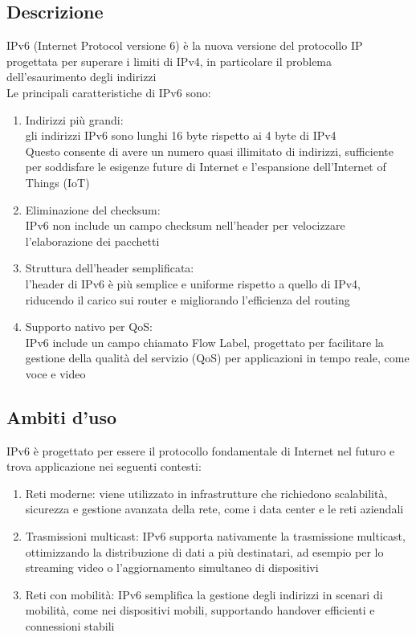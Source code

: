 \documentclass[10pt,oneside,a4paper]{article}
\begin{document}
\subsection{Descrizione}
IPv6 (Internet Protocol versione 6) è la nuova versione del protocollo IP progettata per superare i limiti di IPv4, in particolare il problema dell'esaurimento degli indirizzi\\
Le principali caratteristiche di IPv6 sono:
\begin{enumerate}
\item Indirizzi più grandi:\\
gli indirizzi IPv6 sono lunghi 16 byte rispetto ai 4 byte di IPv4\\
Questo consente di avere un numero quasi illimitato di indirizzi, sufficiente per soddisfare le esigenze future di Internet e l'espansione dell'Internet of Things (IoT)
\item Eliminazione del checksum:\\
IPv6 non include un campo checksum nell'header per velocizzare l'elaborazione dei pacchetti
\item Struttura dell'header semplificata:\\
l'header di IPv6 è più semplice e uniforme rispetto a quello di IPv4, riducendo il carico sui router e migliorando l'efficienza del routing
\item Supporto nativo per QoS:\\
IPv6 include un campo chiamato Flow Label, progettato per facilitare la gestione della qualità del servizio (QoS) per applicazioni in tempo reale, come voce e video
\end{enumerate}
\subsection{Ambiti d'uso}
IPv6 è progettato per essere il protocollo fondamentale di Internet nel futuro e trova applicazione nei seguenti contesti:
\begin{enumerate}
\item Reti moderne: viene utilizzato in infrastrutture che richiedono scalabilità, sicurezza e gestione avanzata della rete, come i data center e le reti aziendali
\item Trasmissioni multicast: IPv6 supporta nativamente la trasmissione multicast, ottimizzando la distribuzione di dati a più destinatari, ad esempio per lo streaming video o l'aggiornamento simultaneo di dispositivi
\item Reti con mobilità: IPv6 semplifica la gestione degli indirizzi in scenari di mobilità, come nei dispositivi mobili, supportando handover efficienti e connessioni stabili
\end{enumerate}
\end{document}
